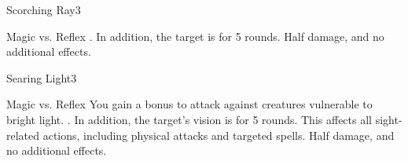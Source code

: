 \begin{spellsection}{Scorching Ray}{3}
    \begin{spellheader}
    \end{spellheader}
    \begin{spellcontent}
        \begin{spelltargetinginfo}
        \end{spelltargetinginfo}
        \begin{spelleffects}
            \begin{spellattack}{Magic vs. Reflex}
                \spellsuccess {}. In addition, the target is \ignited for 5 rounds.
                \spellfailure Half damage, and no additional effects.
            \end{spellattack}
        \end{spelleffects}
    \end{spellcontent}
    \begin{spellfooter}
        \miscastrandom
    \end{spellfooter}
\end{spellsection}

\begin{spellsection}{Searing Light}{3}
    \begin{spellheader}
    \end{spellheader}
    \begin{spellcontent}
        \begin{spelltargetinginfo}
        \end{spelltargetinginfo}
        \begin{spelleffects}
            \begin{spellattack}{Magic vs. Reflex}
                \spellspecial You gain a  bonus to attack against creatures vulnerable to bright light.
                \spellsuccess {}. In addition, the target's vision is \impaired for 5 rounds. This affects all sight-related actions, including physical attacks and targeted spells.
                \spellfailure Half damage, and no additional effects.
            \end{spellattack}
        \end{spelleffects}
    \end{spellcontent}
    \begin{spellfooter}
        \miscastrandom
    \end{spellfooter}
\end{spellsection}

